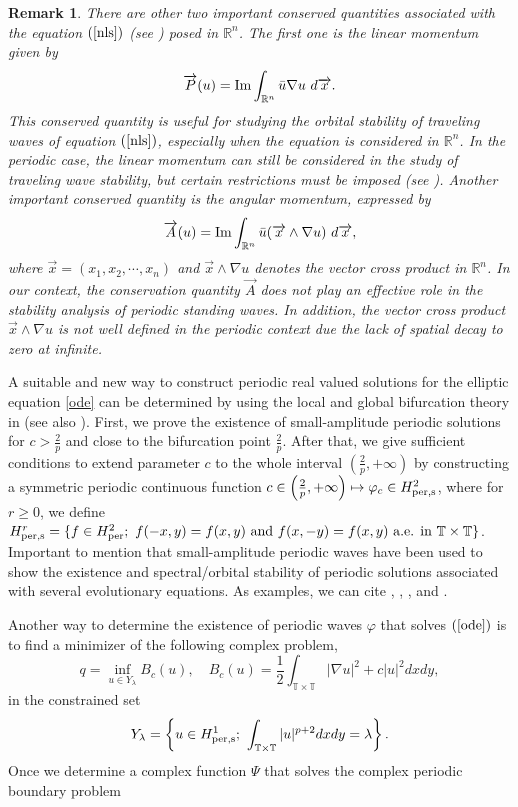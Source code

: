 \documentclass[12pt,reqno,a4paper]{amsart} %
\numberwithin{equation}{section}
\numberwithin{figure}{section}
\newtheorem{remark}[theorem]{Remark}
\begin{document}
		\begin{remark}
			There are other two important conserved quantities associated with the equation $(\ref{nls})$ (see \cite[Section 2]{sulem}) posed in $\mathbb{R}^n$. The first one is the linear momentum given by
			$$\overrightarrow{P}(u)={\rm Im}\int_{\mathbb{R}^n}\bar{u}\nabla u\ d\overrightarrow{x}.$$
			This conserved quantity is useful for studying the orbital stability of traveling waves of equation $(\ref{nls})$, especially when the equation is considered in $\mathbb{R}^n$. In the periodic case, the linear momentum can still be considered in the study of traveling wave stability, but certain restrictions must be imposed (see \cite[page 3]{NP1}). Another important conserved quantity is the angular momentum, expressed by
			$$\overrightarrow{A}(u)={\rm Im}\int_{\mathbb{R}^n}\bar{u}(\overrightarrow{x}\wedge\nabla u)\ d\overrightarrow{x},$$
		where $\overrightarrow{x}=(x_1,x_2,\cdots,x_n)$ and $\overrightarrow{x}\wedge\nabla u$ denotes the vector cross product in $\mathbb{R}^n$. In our context, the conservation quantity $\overrightarrow{A}$ does not play an effective role in the stability analysis of periodic standing waves. In addition, the vector cross product $\overrightarrow{x}\wedge\nabla u$ is not well defined in the periodic context due the lack of spatial decay to zero at infinite.
		\end{remark}
		\indent A suitable and new way to construct periodic real valued solutions for the elliptic equation \eqref{ode} can be determined by using the local and global bifurcation theory in \cite{buffoni-toland} (see also \cite{BD}). First, we prove the existence of small-amplitude periodic solutions for $c>\frac{2}{p}$ and close to the bifurcation point $\frac{2}{p}$. After that, we give sufficient conditions to extend parameter $c$ to the whole interval $\left(\frac{2}{p},+\infty\right)$ by constructing a symmetric periodic continuous function $c \in \left( \frac{2}{p}, +\infty \right) \mapsto \varphi_{c} \in H_{\rm per,s}^{2}$,
		where for $r\geq0$, we define $H_{\rm per,s}^{r}=\{f\in H_{\rm per}^2;\ f(-x,y)=f(x,y)\ \mbox{and}\ f(x,-y)=f(x,y)\ \mbox{a.e. in}\ \mathbb{T}\times\mathbb{T}\}$. Important to mention that small-amplitude periodic waves have been used to show the existence and spectral/orbital stability of periodic solutions associated with several evolutionary equations. As examples, we can cite \cite{natali1}, \cite{natali2}, \cite{natali3}, and \cite{natali4}.
	
	
Another way to determine the existence of periodic waves $\varphi$ that solves $(\ref{ode})$ is to find a minimizer of the following complex problem,
	\begin{equation}
		\label{infB2}
		q = \inf_{u\in Y_\lambda} B_c(u), \quad
		B_c(u) = \frac{1}{2}\int_{\mathbb{T}\times\mathbb{T}}|\nabla u|^2+c|u|^2dxdy,
	\end{equation}
	in the constrained set
	\begin{equation}
		\label{Y-constraint2}
		Y_{\lambda} = \left\{u\in H_{\rm per,s}^1;\ \int_{\mathbb{T}\times\mathbb{T}} |u|^{p+2} dxdy = \lambda \right\}.
	\end{equation}
	\indent Once we determine a complex function $\Psi$ that solves the complex periodic boundary problem 
	
\end{document}

